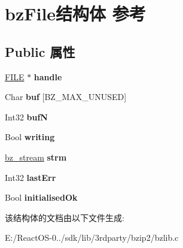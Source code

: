 \hypertarget{structbz_file}{}\section{bz\+File结构体 参考}
\label{structbz_file}
\subsection*{Public 属性}
\begin{DoxyCompactItemize}
\item 
\mbox{\label{structbz_file_a3d38c435d545b14eaa38db1d569d64b5}} 
\hyperlink{struct__iobuf}{F\+I\+LE} $\ast$ {\bfseries handle}
\item 
\mbox{\label{structbz_file_a5899bab16e8dc86cdcb9dba1eee3a27d}} 
Char {\bfseries buf} \mbox{[}B\+Z\+\_\+\+M\+A\+X\+\_\+\+U\+N\+U\+S\+ED\mbox{]}
\item 
\mbox{\label{structbz_file_a4a19af6faa294019774c79d3d556b4c5}} 
Int32 {\bfseries bufN}
\item 
\mbox{\label{structbz_file_add23e1bf4a70d3b47e53738ea6ea779c}} 
Bool {\bfseries writing}
\item 
\mbox{\label{structbz_file_a80361d5f89e6b81e3054a7f66251755b}} 
\hyperlink{structbz__stream}{bz\+\_\+stream} {\bfseries strm}
\item 
\mbox{\label{structbz_file_ac74fd63e8d38ce89a165de8aa70cfab1}} 
Int32 {\bfseries last\+Err}
\item 
\mbox{\label{structbz_file_a9786a78aa951d4ec101350dbaf6328d1}} 
Bool {\bfseries initialised\+Ok}
\end{DoxyCompactItemize}


该结构体的文档由以下文件生成\+:\begin{DoxyCompactItemize}
\item 
E\+:/\+React\+O\+S-\/0../sdk/lib/3rdparty/bzip2/bzlib.\+c\end{DoxyCompactItemize}
